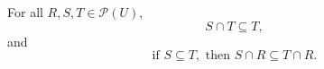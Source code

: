 For all $R, S, T \in \mathcal{P}(U)$,
$$S \cap T \subseteq T,$$
and
$$\text{if } S \subseteq T, \text{ then } S \cap R \subseteq T \cap R.$$
